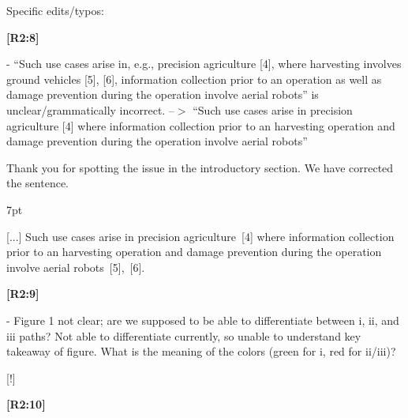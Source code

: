 \documentclass[10pt]{letter}
\newenvironment{formal}{%
  \def\FrameCommand{%
    \hspace{1pt}%
    {\color{red}\vrule width 2pt}%
    {\color{formalshade}\vrule width 4pt}%
    \colorbox{formalshade}%
  }%
  \MakeFramed{\advance\hsize-\width\FrameRestore}%
  \noindent\hspace{-4.55pt}%
  \begin{adjustwidth}{}{7pt}%
  \vspace{2pt}\vspace{2pt}%
}
{%
  \vspace{2pt}\end{adjustwidth}\endMakeFramed%
}
\begin{document}
\vspace{2em}

Specific edits/typos: 

{\hspace*{-4.5em}\textbf{[R2:8]}\vspace*{-1.9em}}

- ``Such use cases arise in, e.g., precision agriculture [4], where harvesting involves ground vehicles [5], [6], information collection prior to an operation as well as damage prevention during the operation involve aerial robots'' is unclear/grammatically incorrect. --$>$	``Such use cases arise in precision agriculture [4] where information collection prior to an harvesting operation and damage prevention during the operation involve aerial robots''
  
{\color{blue}

{\hspace*{-4.5em}{[R2:8]}\vspace*{-1.9em}}

Thank you for spotting the issue in the introductory section. We have corrected the sentence.

\begin{formal}
  \color{black} [...] Such use cases arise in precision agriculture~[{\color{green}4}] where {\color{blue}information collection prior to an harvesting operation and} damage prevention during the operation involve aerial robots~[{\color{green}5}],~[{\color{green}6}].

  \vspace*{1ex}
\end{formal}

}

{\hspace*{-4.5em}\textbf{[R2:9]}\vspace*{-1.9em}}

- Figure 1 not clear; are we supposed to be able to differentiate between i, ii, and iii paths? Not able to differentiate currently, so unable to understand key takeaway of figure. What is the meaning of the colors (green for i, red for ii/iii)?
  
{\color{blue} 

{\hspace*{-4.5em}{[R2:9]}\vspace*{-1.9em}}

[!]}

{\hspace*{-4.5em}\textbf{[R2:10]}\vspace*{-1.9em}}
\end{document}
